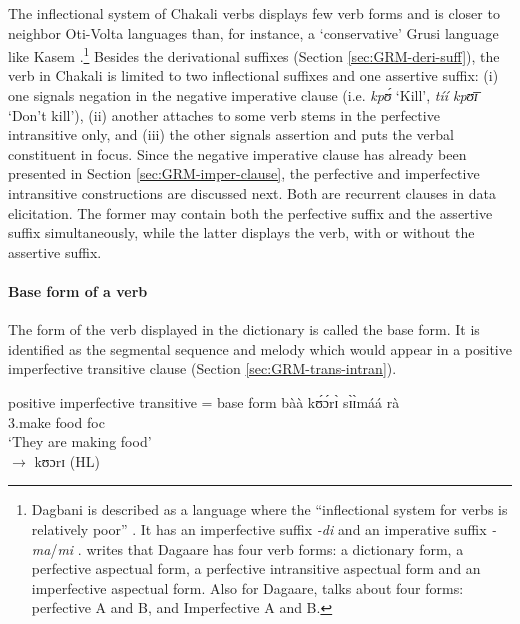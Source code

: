 \begin{exe}
\begin{exe}
\begin{exe}
{\begin{exe}
\begin{exe}
\begin{exe}
\begin{exe}
\begin{exe}
\begin{exe}
\begin{exe}
\begin{xlist}
\begin{exe}
\begin{exe}
\begin{exe}
\begin{exe}
\begin{exe}
\begin{exe}
\begin{exe}
\begin{exe}
\begin{exe}
\begin{exe}
\begin{exe}
\begin{exe}
\begin{exe}
The inflectional system of Chakali verbs displays  few verb
forms and is closer  to neighbor Oti-Volta languages than, for instance,  a
`conservative' Grusi language like Kasem \cite[51]{Bonv88}.\footnote{Dagbani is
described as a language where the ``inflectional system  for verbs is relatively
poor''  \cite[96]{Olaw99}. It has an imperfective suffix {\it -di}
\cite[97]{Olaw99} and  an imperative suffix {\it -ma}/{\it mi} 
\cite[101]{Olaw99}.
\citet[81]{Bodo97} writes that Dagaare has four verb forms: a dictionary
form, a perfective aspectual form, a perfective intransitive aspectual form and
an imperfective aspectual form. Also for Dagaare, \citet{Saan03}  talks about
four forms: perfective A and B, and Imperfective A  and B.}  Besides the
derivational suffixes (Section \ref{sec:GRM-deri-suff}), the verb in Chakali is
limited to two
inflectional suffixes and one assertive suffix:  (i) one signals negation in the
negative imperative clause (i.e.  {\it  kpʊ́} `Kill',  {\it tíí kpʊ̄ɪ̄} `Don't
kill'),  (ii) another attaches to some verb stems in the perfective intransitive
only, and (iii)  the other signals assertion and puts the verbal constituent in
focus. Since the negative imperative clause has already been presented in
Section
\ref{sec:GRM-imper-clause}, the perfective and imperfective intransitive
constructions are discussed next.  Both are recurrent clauses in data
elicitation. The former may contain both the perfective
suffix and the assertive suffix simultaneously, while the latter  displays the
 verb, with or without the assertive suffix.
 
 
 
\paragraph{Base form of a verb}
\label{sec:GRM-base-verb}

The form of the verb displayed in the dictionary is called the base form.  It  
is identified as the segmental sequence and melody which  would appear in a
positive imperfective transitive clause (Section \ref{sec:GRM-trans-intran}). 


\ea\label{ex:GRM-base-form}{\rm  positive imperfective transitive = base form}
\gll  
bàà kʊ́ɔ́rɪ̀ sɪ̀ɪ̀máá rà \\
3.\pl make food {\sc foc}\\
\glt `They are making food' \\
$\rightarrow$ {\rm kʊɔrɪ  (HL)}
 \z


\end{exe}
\end{exe}
\end{exe}
\end{exe}
\end{exe}
\end{exe}
\end{exe}
\end{exe}
\end{exe}
\end{exe}
\end{exe}
\end{exe}
\end{exe}
\end{xlist}
\end{exe}
\end{exe}
\end{exe}
\end{exe}
\end{exe}
\end{exe}
\end{exe}}
\end{exe}
\end{exe}
\end{exe}
